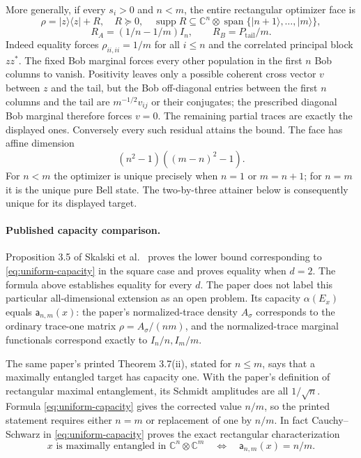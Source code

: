 More generally, if every $s_i>0$ and $n<m$, the entire rectangular
optimizer face is
\[
 \rho=|z\rangle\langle z|+R,\quad R\succeq0,\quad
 \operatorname{supp}R\subseteq\mathbb C^n\otimes
                    \operatorname{span}\{|n+1\rangle,\ldots,|m\rangle\},
\]
\[
 R_A=(1/n-1/m)I_n,\qquad R_B=P_{\mathrm{tail}}/m.
\]
Indeed equality forces $\rho_{ii,ii}=1/m$ for all $i\le n$ and the
correlated principal block $zz^*$. The fixed Bob marginal forces every
other population in the first $n$ Bob columns to vanish. Positivity leaves
only a possible coherent cross vector $v$ between $z$ and the tail, but
the Bob off-diagonal entries between the first $n$ columns and the tail
are $m^{-1/2}v_{ij}$ or their conjugates; the prescribed diagonal Bob
marginal therefore forces $v=0$. The remaining partial traces are exactly
the displayed ones. Conversely every such residual attains the bound.
The face has affine dimension
\[
 (n^2-1)((m-n)^2-1).
\]
For $n<m$ the optimizer is unique precisely when $n=1$ or $m=n+1$;
for $n=m$ it is the unique pure Bell state. The two-by-three attainer below
is consequently unique for its displayed target.

\paragraph{Published capacity comparison.}
Proposition 3.5 of Skalski et al.~\cite{capacity2025} proves the lower bound
corresponding to \eqref{eq:uniform-capacity} in the square case and proves
equality when $d=2$. The formula above establishes equality for every $d$.
The paper does not label this particular all-dimensional extension as an
open problem. Its capacity $\alpha(E_x)$ equals $\mathsf a_{n,m}(x)$:
the paper's normalized-trace density $A_\sigma$ corresponds to the ordinary
trace-one matrix $\rho=A_\sigma/(nm)$, and the normalized-trace marginal
functionals correspond exactly to $I_n/n,I_m/m$.

The same paper's printed Theorem 3.7(ii), stated for $n\le m$, says that a
maximally entangled target has capacity one. With the paper's definition
of rectangular maximal entanglement, its Schmidt amplitudes are all
$1/\sqrt n$. Formula \eqref{eq:uniform-capacity} gives the corrected value
$n/m$, so the printed statement requires either $n=m$ or replacement of
one by $n/m$. In fact Cauchy--Schwarz in \eqref{eq:uniform-capacity}
proves the exact rectangular characterization
\[
 x\text{ is maximally entangled in }\mathbb C^n\otimes\mathbb C^m
 \quad\Longleftrightarrow\quad \mathsf a_{n,m}(x)=n/m.
\]

